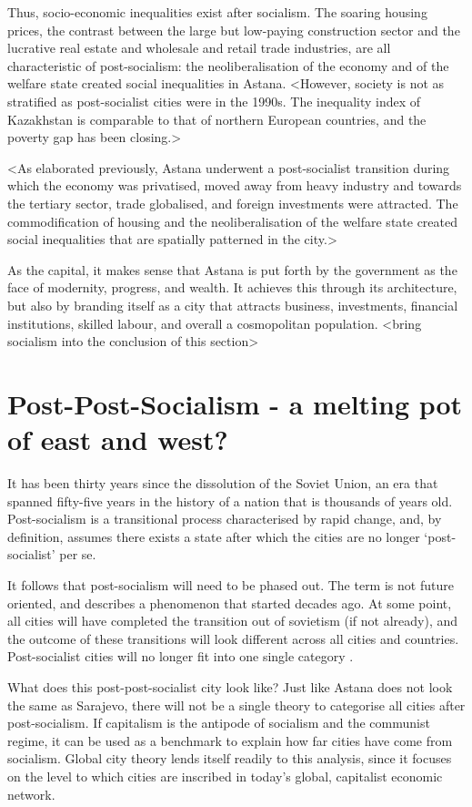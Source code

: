 \documentclass{article}
\begin{document}
Thus, socio-economic inequalities exist after socialism. The soaring housing prices, the contrast between the large but low-paying construction sector and the lucrative real estate and wholesale and retail trade industries, are all characteristic of post-socialism: the neoliberalisation of the economy and of the welfare state created social inequalities in Astana.
<However, society is not as stratified as post-socialist cities were in the 1990s. The inequality index of Kazakhstan is comparable to that of northern European countries, and the poverty gap has been closing.>

<As elaborated previously, Astana underwent a post-socialist transition during which the economy was privatised, moved away from heavy industry and towards the tertiary sector, trade globalised, and foreign investments were attracted. The commodification of housing and the neoliberalisation of the welfare state created social inequalities that are spatially patterned in the city.>

As the capital, it makes sense that Astana is put forth by the government as the face of modernity, progress, and wealth. It achieves this through its architecture, but also by branding itself as a city that attracts business, investments, financial institutions, skilled labour, and overall a cosmopolitan population.
<bring socialism into the conclusion of this section>

\section{Post-Post-Socialism - a melting pot of east and west?}
It has been thirty years since the dissolution of the Soviet Union, an era that spanned fifty-five years in the history of a nation that is thousands of years old. Post-socialism is a transitional process characterised by rapid change, and, by definition, assumes there exists a state after which the cities are no longer `post-socialist' per se.  

It follows that post-socialism will need to be phased out. The term is not future oriented, and describes a phenomenon that started decades ago. At some point, all cities will have completed the transition out of sovietism (if not already), and the outcome of these transitions will look different across all cities and countries. Post-socialist cities will no longer fit into one single category \parencite{hirt2016conceptual}.

What does this post-post-socialist city look like? Just like Astana does not look the same as Sarajevo, there will not be a single theory to categorise all cities after post-socialism. If capitalism is the antipode of socialism and the communist regime, it can be used as a benchmark to explain how far cities have come from socialism. Global city theory lends itself readily to this analysis, since it focuses on the level to which cities are inscribed in today's global, capitalist economic network.
\end{document}
